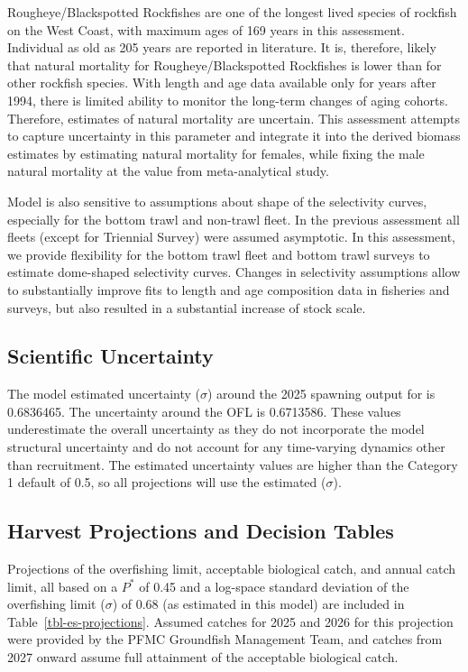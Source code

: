 \documentclass[
]{scrartcl}
\begin{document}
Rougheye/Blackspotted Rockfishes are one of the longest lived species of
rockfish on the West Coast, with maximum ages of 169 years in this
assessment. Individual as old as 205 years are reported in literature.
It is, therefore, likely that natural mortality for
Rougheye/Blackspotted Rockfishes is lower than for other rockfish
species. With length and age data available only for years after 1994,
there is limited ability to monitor the long-term changes of aging
cohorts. Therefore, estimates of natural mortality are uncertain. This
assessment attempts to capture uncertainty in this parameter and
integrate it into the derived biomass estimates by estimating natural
mortality for females, while fixing the male natural mortality at the
value from meta-analytical study.

Model is also sensitive to assumptions about shape of the selectivity
curves, especially for the bottom trawl and non-trawl fleet. In the
previous assessment all fleets (except for Triennial Survey) were
assumed asymptotic. In this assessment, we provide flexibility for the
bottom trawl fleet and bottom trawl surveys to estimate dome-shaped
selectivity curves. Changes in selectivity assumptions allow to
substantially improve fits to length and age composition data in
fisheries and surveys, but also resulted in a substantial increase of
stock scale.

\subsection{Scientific Uncertainty}\label{scientific-uncertainty}

The model estimated uncertainty (\(\sigma\)) around the 2025 spawning
output for is 0.6836465. The uncertainty around the OFL is 0.6713586.
These values underestimate the overall uncertainty as they do not
incorporate the model structural uncertainty and do not account for any
time-varying dynamics other than recruitment. The estimated uncertainty
values are higher than the Category 1 default of 0.5, so all projections
will use the estimated (\(\sigma\)).

\subsection{Harvest Projections and Decision
Tables}\label{harvest-projections-and-decision-tables}

Projections of the overfishing limit, acceptable biological catch, and
annual catch limit, all based on a \(P^*\) of 0.45 and a log-space
standard deviation of the overfishing limit (\(\sigma\)) of 0.68 (as
estimated in this model) are included in Table~\ref{tbl-es-projections}.
Assumed catches for 2025 and 2026 for this projection were provided by
the PFMC Groundfish Management Team, and catches from 2027 onward assume
full attainment of the acceptable biological catch.
\end{document}
